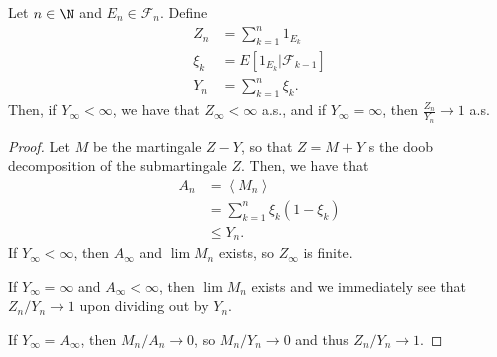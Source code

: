 \documentclass[10pt]{mypackage}
\begin{document}
\begin{theorem}
  Let $n\in \N$ and $E_n\in \mathcal{F}_n$. Define
  \begin{align*}
    Z_n &= \sum_{k=1}^{n}1_{E_k}\\
    \xi_k &= E\left[ 1_{E_k}|\mathcal{F}_{k-1} \right]\\
    Y_n &= \sum_{k=1}^{n}\xi_k.
  \end{align*}
  Then, if $Y_{\infty} < \infty$, we have that $Z_{\infty} < \infty$ a.s., and if $Y_{\infty} = \infty$, then $\frac{Z_n}{Y_n}\to 1$ a.s.
\end{theorem}
\begin{proof}
  Let $M$ be the martingale $Z-Y$, so that $Z = M + Y$ s the doob decomposition of the submartingale $Z$. Then, we have that
  \begin{align*}
    A_n &= \left\langle M_n \right\rangle\\
        &= \sum_{k=1}^{n}\xi_k\left( 1-\xi_k \right)\\
        &\leq Y_n.
  \end{align*}
  If $Y_{\infty} < \infty$, then $A_{\infty}$ and $\lim M_n$ exists, so $Z_{\infty}$ is finite.

  If $Y_{\infty} = \infty$ and $A_{\infty} < \infty$, then $\lim M_n$ exists and we immediately see that $Z_n/Y_n\to 1$ upon dividing out by $Y_n$.

  If $Y_{\infty} = A_{\infty}$, then $M_n/A_n\to 0$, so $M_n/Y_n\to 0$ and thus $Z_n/Y_n\to 1$.
\end{proof}
\end{document}
